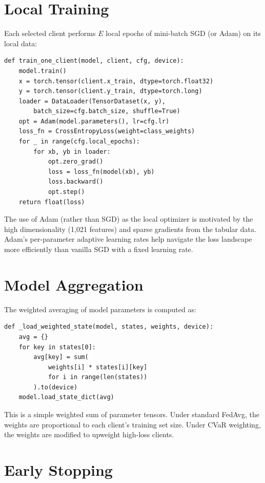 \documentclass[11pt,a4paper]{report}
\begin{document}
\section{Local Training}

Each selected client performs $E$ local epochs of mini-batch SGD (or Adam) on its local data:

\begin{lstlisting}
def train_one_client(model, client, cfg, device):
    model.train()
    x = torch.tensor(client.x_train, dtype=torch.float32)
    y = torch.tensor(client.y_train, dtype=torch.long)
    loader = DataLoader(TensorDataset(x, y),
        batch_size=cfg.batch_size, shuffle=True)
    opt = Adam(model.parameters(), lr=cfg.lr)
    loss_fn = CrossEntropyLoss(weight=class_weights)
    for _ in range(cfg.local_epochs):
        for xb, yb in loader:
            opt.zero_grad()
            loss = loss_fn(model(xb), yb)
            loss.backward()
            opt.step()
    return float(loss)
\end{lstlisting}

The use of Adam (rather than SGD) as the local optimizer is motivated by the high dimensionality (1,021 features) and sparse gradients from the tabular data. Adam's per-parameter adaptive learning rates help navigate the loss landscape more efficiently than vanilla SGD with a fixed learning rate.

\section{Model Aggregation}

The weighted averaging of model parameters is computed as:
\begin{lstlisting}
def _load_weighted_state(model, states, weights, device):
    avg = {}
    for key in states[0]:
        avg[key] = sum(
            weights[i] * states[i][key]
            for i in range(len(states))
        ).to(device)
    model.load_state_dict(avg)
\end{lstlisting}

This is a simple weighted sum of parameter tensors. Under standard FedAvg, the weights are proportional to each client's training set size. Under CVaR weighting, the weights are modified to upweight high-loss clients.

\section{Early Stopping}
\end{document}
